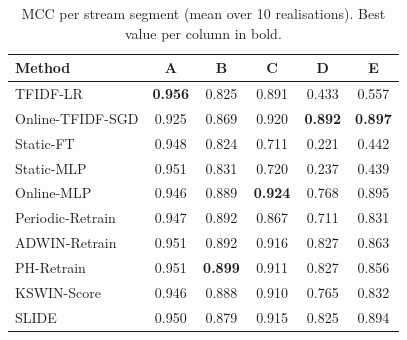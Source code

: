 \begin{table}[t]
\centering
\caption{MCC per stream segment (mean over 10 realisations). Best value per column in bold.}
\label{tab:segments}
\scriptsize
\setlength{\tabcolsep}{3.5pt}
\begin{tabular}{@{}lccccc@{}}
\toprule
Method & A & B & C & D & E \\
\midrule
TFIDF-LR & \textbf{0.956} & 0.825 & 0.891 & 0.433 & 0.557 \\
Online-TFIDF-SGD & 0.925 & 0.869 & 0.920 & \textbf{0.892} & \textbf{0.897} \\
Static-FT & 0.948 & 0.824 & 0.711 & 0.221 & 0.442 \\
Static-MLP & 0.951 & 0.831 & 0.720 & 0.237 & 0.439 \\
Online-MLP & 0.946 & 0.889 & \textbf{0.924} & 0.768 & 0.895 \\
Periodic-Retrain & 0.947 & 0.892 & 0.867 & 0.711 & 0.831 \\
ADWIN-Retrain & 0.951 & 0.892 & 0.916 & 0.827 & 0.863 \\
PH-Retrain & 0.951 & \textbf{0.899} & 0.911 & 0.827 & 0.856 \\
KSWIN-Score & 0.946 & 0.888 & 0.910 & 0.765 & 0.832 \\
SLIDE & 0.950 & 0.879 & 0.915 & 0.825 & 0.894 \\
\bottomrule
\end{tabular}
\end{table}
